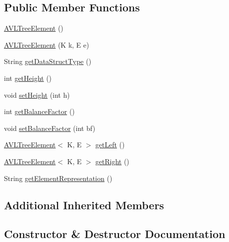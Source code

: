 \subsection*{Public Member Functions}
\begin{DoxyCompactItemize}
\item 
\mbox{\hyperlink{classbridges_1_1base_1_1_a_v_l_tree_element_a8fe4490d3d5d16991736bd1a7243b904}{A\+V\+L\+Tree\+Element}} ()
\item 
\mbox{\hyperlink{classbridges_1_1base_1_1_a_v_l_tree_element_a060ec94b52675313ad15388e3f292df5}{A\+V\+L\+Tree\+Element}} (K k, E e)
\item 
String \mbox{\hyperlink{classbridges_1_1base_1_1_a_v_l_tree_element_abdd9e63de10732ef46bd5d531bd7f9d8}{get\+Data\+Struct\+Type}} ()
\item 
int \mbox{\hyperlink{classbridges_1_1base_1_1_a_v_l_tree_element_a52fe2886334c841547d238db69022697}{get\+Height}} ()
\item 
void \mbox{\hyperlink{classbridges_1_1base_1_1_a_v_l_tree_element_ac42b744989ed7e18dcbd52980e674b33}{set\+Height}} (int h)
\item 
int \mbox{\hyperlink{classbridges_1_1base_1_1_a_v_l_tree_element_a0478ca0351cd714e8f7b8e49703990c8}{get\+Balance\+Factor}} ()
\item 
void \mbox{\hyperlink{classbridges_1_1base_1_1_a_v_l_tree_element_a0dc3c83e750cc39535afb08ea92f6c98}{set\+Balance\+Factor}} (int bf)
\item 
\mbox{\hyperlink{classbridges_1_1base_1_1_a_v_l_tree_element}{A\+V\+L\+Tree\+Element}}$<$ K, E $>$ \mbox{\hyperlink{classbridges_1_1base_1_1_a_v_l_tree_element_a86f1329b19d2886ba7bf713e3844ecd6}{get\+Left}} ()
\item 
\mbox{\hyperlink{classbridges_1_1base_1_1_a_v_l_tree_element}{A\+V\+L\+Tree\+Element}}$<$ K, E $>$ \mbox{\hyperlink{classbridges_1_1base_1_1_a_v_l_tree_element_aab93418ac19605f2c7c57aa38d110921}{get\+Right}} ()
\item 
String \mbox{\hyperlink{classbridges_1_1base_1_1_a_v_l_tree_element_af7ab86f2421864daa4fdc2e84939f4ce}{get\+Element\+Representation}} ()
\end{DoxyCompactItemize}
\subsection*{Additional Inherited Members}


\subsection{Constructor \& Destructor Documentation}
\mbox{\label{classbridges_1_1base_1_1_a_v_l_tree_element_a8fe4490d3d5d16991736bd1a7243b904}} 
